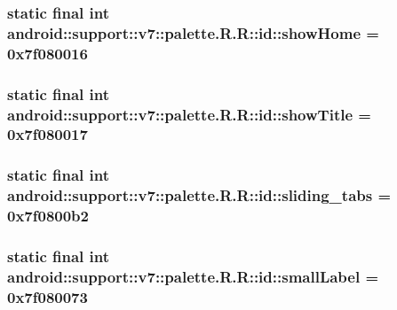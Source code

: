\hypertarget{classandroid_1_1support_1_1v7_1_1palette_1_1_r_1_1id_b004ad42810b72f597cd9d5b10680b96}{
\subsubsection[{showHome}]{\setlength{\rightskip}{0pt plus 5cm}static final int android::support::v7::palette.R.R::id::showHome = 0x7f080016}}
\label{classandroid_1_1support_1_1v7_1_1palette_1_1_r_1_1id_b004ad42810b72f597cd9d5b10680b96}


\hypertarget{classandroid_1_1support_1_1v7_1_1palette_1_1_r_1_1id_c7b33cb93f7c716932ca3813c4cbd428}{
\subsubsection[{showTitle}]{\setlength{\rightskip}{0pt plus 5cm}static final int android::support::v7::palette.R.R::id::showTitle = 0x7f080017}}
\label{classandroid_1_1support_1_1v7_1_1palette_1_1_r_1_1id_c7b33cb93f7c716932ca3813c4cbd428}


\hypertarget{classandroid_1_1support_1_1v7_1_1palette_1_1_r_1_1id_8ec77c1ba50342eddd311375bcc3a93b}{
\subsubsection[{sliding\_\-tabs}]{\setlength{\rightskip}{0pt plus 5cm}static final int android::support::v7::palette.R.R::id::sliding\_\-tabs = 0x7f0800b2}}
\label{classandroid_1_1support_1_1v7_1_1palette_1_1_r_1_1id_8ec77c1ba50342eddd311375bcc3a93b}


\hypertarget{classandroid_1_1support_1_1v7_1_1palette_1_1_r_1_1id_4e44420e22ebef6c212518917f6cbc3c}{
\subsubsection[{smallLabel}]{\setlength{\rightskip}{0pt plus 5cm}static final int android::support::v7::palette.R.R::id::smallLabel = 0x7f080073}}
\label{classandroid_1_1support_1_1v7_1_1palette_1_1_r_1_1id_4e44420e22ebef6c212518917f6cbc3c}


